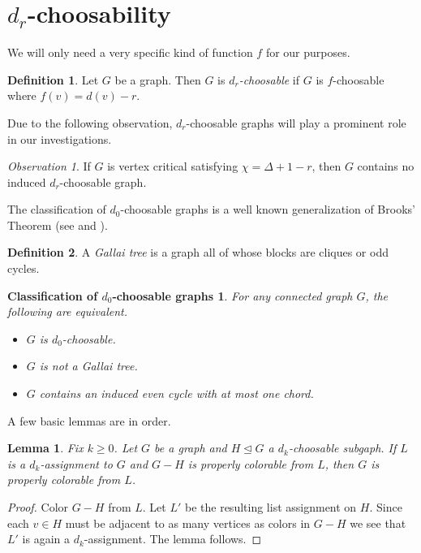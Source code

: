 \documentclass[12pt]{article}
\theoremstyle{plain}
\newtheorem{lem}[thm]{Lemma}
\newtheorem*{ClassificationOfd0}{Classification of $d_0$-choosable graphs}
\theoremstyle{definition}
\newtheorem{defn}{Definition}[section]
\theoremstyle{remark}
\newtheorem*{observation}{Observation}
\begin{document}
\section{$d_r$-choosability}
We will only need a very specific kind of function $f$ for our purposes.

\begin{defn}
Let $G$ be a graph.  Then $G$ is \emph{$d_r$-choosable} if $G$ is $f$-choosable where $f(v) = d(v) - r$.
\end{defn}

Due to the following observation, $d_r$-choosable graphs will play a prominent role in our investigations.

\begin{observation}
If $G$ is vertex critical satisfying $\chi = \Delta + 1 - r$, then $G$ contains no induced $d_r$-choosable graph.
\end{observation}

The classification of $d_0$-choosable graphs is a well known generalization of Brooks' Theorem (see \cite{BrooksExtended} and \cite{Hladky}).

\begin{defn}
A \emph{Gallai tree} is a graph all of whose blocks are cliques or odd cycles.
\end{defn}

\begin{ClassificationOfd0}
For any connected graph $G$, the following are equivalent.
\begin{itemize}
\item $G$ is $d_0$-choosable.
\item $G$ is not a Gallai tree.
\item $G$ contains an induced even cycle with at most one chord.
\end{itemize}
\end{ClassificationOfd0}

A few basic lemmas are in order.

\begin{lem}\label{PartialdkLemma}
Fix $k \geq 0$. Let $G$ be a graph and $H \unlhd G$ a $d_k$-choosable subgaph. If $L$ is a $d_k$-assignment to $G$ and $G - H$ is properly colorable from $L$, then $G$ is properly colorable from $L$.
\end{lem}
\begin{proof}
Color $G - H$ from $L$. Let $L'$ be the resulting list assignment on $H$.  Since each $v \in H$ must be adjacent to as
many vertices as colors in $G - H$ we see that $L'$ is again a $d_k$-assignment.  The lemma follows.
\end{proof}
\end{document}
